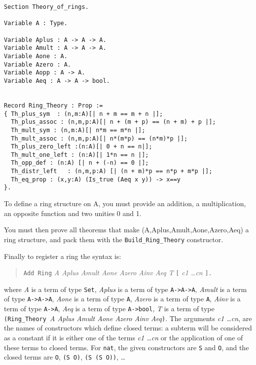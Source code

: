 \begin{small}
\begin{flushleft}
\begin{verbatim}
Section Theory_of_rings.

Variable A : Type.

Variable Aplus : A -> A -> A.
Variable Amult : A -> A -> A.
Variable Aone : A.
Variable Azero : A.
Variable Aopp : A -> A.
Variable Aeq : A -> A -> bool.


Record Ring_Theory : Prop :=
{ Th_plus_sym  : (n,m:A)[| n + m == m + n |];
  Th_plus_assoc : (n,m,p:A)[| n + (m + p) == (n + m) + p |];
  Th_mult_sym : (n,m:A)[| n*m == m*n |];
  Th_mult_assoc : (n,m,p:A)[| n*(m*p) == (n*m)*p |];
  Th_plus_zero_left :(n:A)[| 0 + n == n|];
  Th_mult_one_left : (n:A)[| 1*n == n |];
  Th_opp_def : (n:A) [| n + (-n) == 0 |];
  Th_distr_left   : (n,m,p:A) [| (n + m)*p == n*p + m*p |];
  Th_eq_prop : (x,y:A) (Is_true (Aeq x y)) -> x==y
}.
\end{verbatim}
\end{flushleft}
\end{small}

To define a ring structure on A, you must provide an addition, a
multiplication, an opposite function and two unities 0 and 1.

You must then prove all theorems that make
(A,Aplus,Amult,Aone,Azero,Aeq) 
a ring structure, and pack them with the \verb|Build_Ring_Theory| 
constructor.

Finally to register a ring the syntax is:

\begin{quotation}
  \texttt{Add Ring} \textit{A Aplus Amult Aone Azero Ainv Aeq T}
  \texttt{[} \textit{c1 \dots cn} \texttt{].}
\end{quotation}

\noindent where \textit{A} is a term of type \texttt{Set}, 
\textit{Aplus} is a term of type \texttt{A->A->A},
\textit{Amult} is a term of type \texttt{A->A->A},
\textit{Aone} is a term of type \texttt{A},
\textit{Azero} is a term of type \texttt{A},
\textit{Ainv} is a term of type \texttt{A->A},
\textit{Aeq} is a term of type \texttt{A->bool},
\textit{T} is a term of type 
\texttt{(Ring\_Theory }\textit{A Aplus Amult Aone Azero Ainv
  Aeq}\texttt{)}.
The arguments \textit{c1 \dots cn}, 
are the names of constructors which define closed terms: a
subterm will be considered as a constant if it is either one of the
terms \textit{c1 \dots cn} or the application of one of these terms to
closed terms. For \texttt{nat}, the given constructors are \texttt{S}
and \texttt{O}, and the closed terms are \texttt{O}, \texttt{(S O)},
\texttt{(S (S O))}, \ldots

